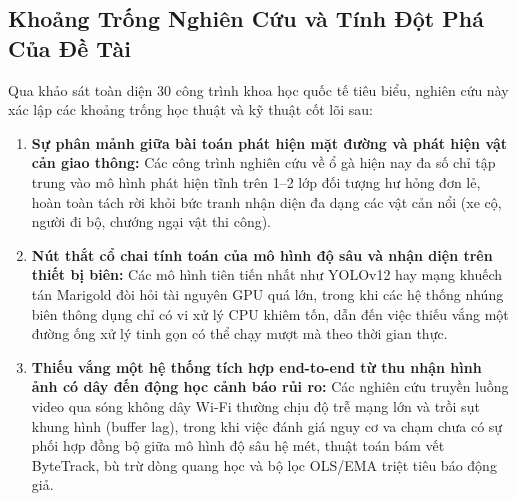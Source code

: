 \documentclass[12pt,a4paper]{article}
\begin{document}
\subsection{Khoảng Trống Nghiên Cứu và Tính Đột Phá Của Đề Tài}
Qua khảo sát toàn diện 30 công trình khoa học quốc tế tiêu biểu, nghiên cứu này xác lập các khoảng trống học thuật và kỹ thuật cốt lõi sau:
\begin{enumerate}
    \item \textbf{Sự phân mảnh giữa bài toán phát hiện mặt đường và phát hiện vật cản giao thông:} Các công trình nghiên cứu về ổ gà hiện nay đa số chỉ tập trung vào mô hình phát hiện tĩnh trên 1--2 lớp đối tượng hư hỏng đơn lẻ, hoàn toàn tách rời khỏi bức tranh nhận diện đa dạng các vật cản nổi (xe cộ, người đi bộ, chướng ngại vật thi công).
    \item \textbf{Nút thắt cổ chai tính toán của mô hình độ sâu và nhận diện trên thiết bị biên:} Các mô hình tiên tiến nhất như YOLOv12 hay mạng khuếch tán Marigold đòi hỏi tài nguyên GPU quá lớn, trong khi các hệ thống nhúng biên thông dụng chỉ có vi xử lý CPU khiêm tốn, dẫn đến việc thiếu vắng một đường ống xử lý tinh gọn có thể chạy mượt mà theo thời gian thực.
    \item \textbf{Thiếu vắng một hệ thống tích hợp end-to-end từ thu nhận hình ảnh có dây đến động học cảnh báo rủi ro:} Các nghiên cứu truyền luồng video qua sóng không dây Wi-Fi thường chịu độ trễ mạng lớn và trồi sụt khung hình (buffer lag), trong khi việc đánh giá nguy cơ va chạm chưa có sự phối hợp đồng bộ giữa mô hình độ sâu hệ mét, thuật toán bám vết ByteTrack, bù trừ dòng quang học và bộ lọc OLS/EMA triệt tiêu báo động giả.
\end{enumerate}
\end{document}
